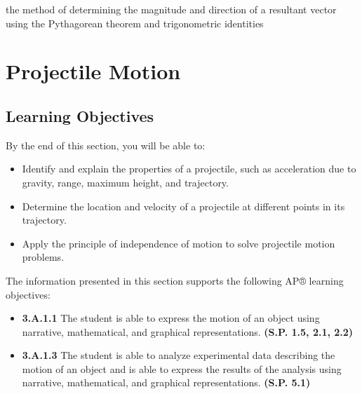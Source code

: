 \documentclass[
]{book}
\providecommand{\tightlist}{%
  \setlength{\itemsep}{0pt}\setlength{\parskip}{0pt}}
\newenvironment{learning-objectives}{}{}
\begin{document}
\begin{description}
\tightlist
\item[analytical method]
the method of determining the magnitude and direction of a resultant
vector using the Pythagorean theorem and trigonometric identities
\end{description}

\hypertarget{projectile-motion}{%
\section{Projectile Motion}\label{projectile-motion}}

\hypertarget{fs-id1563341}{}
\begin{learning-objectives}

\hypertarget{learning-objectives-11}{%
\subsection{Learning Objectives}\label{learning-objectives-11}}

By the end of this section, you will be able to:

\begin{itemize}
\tightlist
\item
  Identify and explain the properties of a projectile, such as
  acceleration due to gravity, range, maximum height, and trajectory.
\item
  Determine the location and velocity of a projectile at different
  points in its trajectory.
\item
  Apply the principle of independence of motion to solve projectile
  motion problems.
\end{itemize}

The information presented in this section supports the following AP®
learning objectives:

\begin{itemize}
\tightlist
\item
  \textbf{3.A.1.1} The student is able to express the motion of an object
  using narrative, mathematical, and graphical representations.
  \textbf{(S.P. 1.5, 2.1, 2.2)}
\item
  \textbf{3.A.1.3} The student is able to analyze experimental data
  describing the motion of an object and is able to express the
  results of the analysis using narrative, mathematical, and graphical
  representations. \textbf{(S.P. 5.1)}
\end{itemize}

\end{learning-objectives}
\end{document}
